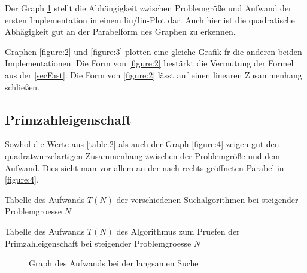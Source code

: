 \documentclass[paper=a4, fontsize=11pt]{scrartcl} %
\numberwithin{equation}{section} %
\numberwithin{figure}{section} %
\numberwithin{table}{section} %
\begin{document}
Der Graph \ref{figure:1} stellt die Abh\"angigkeit zwischen Problemgr\"o{\ss}e und
Aufwand der ersten Implementation in einem lin/lin-Plot dar. Auch hier ist die
quadratische Abh\"agigkeit gut an der Parabelform des Graphen zu erkennen.

Graphen \ref{figure:2} und \ref{figure:3} plotten eine gleiche Grafik f\"r die
anderen beiden Implementationen. Die Form von \ref{figure:2} best\"arkt die Vermutung
der Formel aus der \ref{secFast}. Die Form von \ref{figure:2} l\"asst auf einen
linearen Zusammenhang schlie{\ss}en.

\subsection{Primzahleigenschaft}

Sowhol die Werte aus \ref{table:2} als auch der Graph \ref{figure:4} zeigen gut
den quadratwurzelartigen Zusammenhang zwischen der Problemgr\"o{\ss}e und dem Aufwand.
Dies sieht man vor allem an der nach rechts ge\"offneten Parabel in \ref{figure:4}.

\begin{table}
  \centering
  \caption{Tabelle des Aufwands $T(N)$ der verschiedenen Suchalgorithmen bei
  steigender Problemgroesse $N$}
  \label{table:1}
\end{table}

\begin{table}
  \centering
  \caption{Tabelle des Aufwands $T(N)$ des Algorithmus zum Pruefen der
  Primzahleigenschaft bei steigender Problemgroesse $N$}
  \label{table:2}
\end{table}

\begin{figure}
  \centering
  \caption{Graph des Aufwands bei der langsamen Suche}
  \label{figure:1}
\end{figure}
\end{document}
